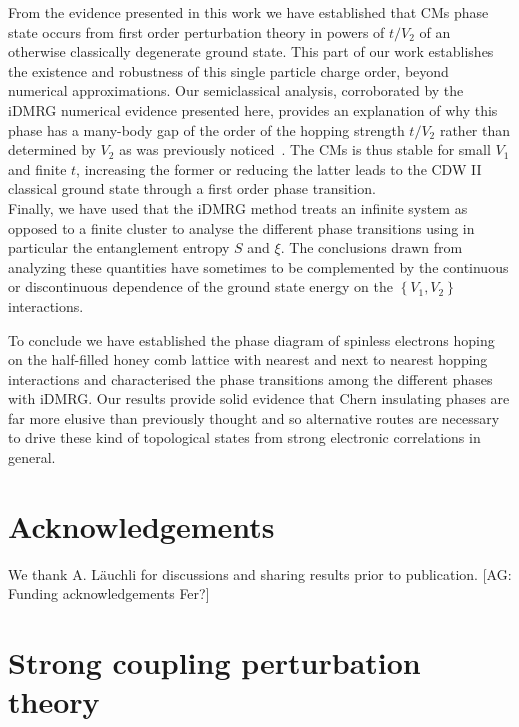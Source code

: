 \documentclass[aps,prx,10pt,twocolumn,floatfix,superscriptaddress,showpacs,numerical,footinbib]{revtex4-1}
\newcommand{\noteAG}[1]{{\color{blue} [AG: #1]}}
\begin{document}
From the evidence presented in this work we have established that CMs phase state occurs from first
order perturbation theory in powers of $t/V_{2}$ of an otherwise classically degenerate ground state.
%
This part of our work establishes the existence and robustness 
of this single particle charge order, beyond numerical approximations.
%
Our semiclassical analysis, corroborated by the iDMRG numerical evidence presented here,
provides an explanation of why this phase has a many-body gap of the order of the hopping strength $t/V_{2}$ 
rather than determined by $V_{2}$ as was previously noticed~\cite{GCC13,DH14,DCH14}.
%
The CMs is thus stable for small $V_{1}$ and finite $t$, increasing the former or reducing the latter leads to the CDW II classical ground state
through a first order phase transition.\\
%
Finally, we have used that the iDMRG method treats an infinite system as opposed to a finite cluster to analyse 
the different phase transitions using in particular the entanglement entropy $S$ and $\xi$.
%
The conclusions drawn from analyzing these quantities have sometimes to be complemented by the continuous 
or discontinuous dependence of the ground state energy on the $\left\lbrace V_{1},V_{2}\right\rbrace$ interactions.
%

To conclude we have established the phase diagram of spinless electrons hoping on the half-filled honey comb lattice
with nearest and next to nearest hopping interactions and characterised the phase transitions among the different phases with iDMRG.
%
Our results provide solid evidence that Chern insulating phases are far more elusive than previously thought and
so alternative routes are necessary to drive these kind of topological states from strong electronic correlations in general.
%
\section{Acknowledgements}

We thank A. L\"auchli for discussions and sharing results prior to publication.
\noteAG{Funding acknowledgements Fer?}

\appendix

\section{\label{sec:appendix} Strong coupling perturbation theory}
\end{document}
